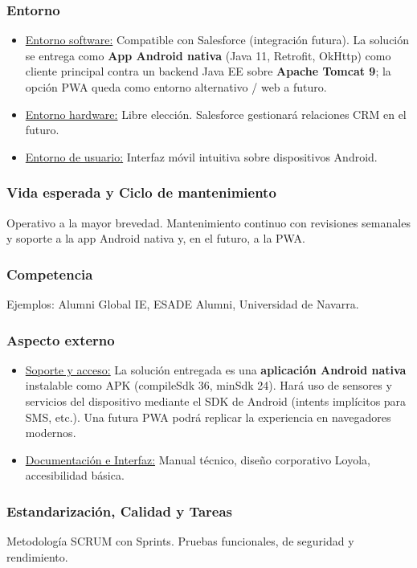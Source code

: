 \documentclass{report}
\begin{document}
\subsubsection{Entorno}
\begin{itemize}
    \item{\underline{Entorno software:}} Compatible con Salesforce (integración futura). La solución se entrega como \textbf{App Android nativa} (Java 11, Retrofit, OkHttp) como cliente principal contra un backend Java EE sobre \textbf{Apache Tomcat 9}; la opción PWA queda como entorno alternativo / web a futuro.
    \item{\underline{Entorno hardware:}} Libre elección. Salesforce gestionará relaciones CRM en el futuro.
    \item{\underline{Entorno de usuario:}} Interfaz móvil intuitiva sobre dispositivos Android.
\end{itemize}

\subsubsection{Vida esperada y Ciclo de mantenimiento}
Operativo a la mayor brevedad. Mantenimiento continuo con revisiones semanales y soporte a la app Android nativa y, en el futuro, a la PWA.

\subsubsection{Competencia}
Ejemplos: Alumni Global IE, ESADE Alumni, Universidad de Navarra.

\subsubsection{Aspecto externo}
\begin{itemize}
    \item{\underline{Soporte y acceso:}} La solución entregada es una \textbf{aplicación Android nativa} instalable como APK (compileSdk 36, minSdk 24). Hará uso de sensores y servicios del dispositivo mediante el SDK de Android (intents implícitos para SMS, etc.). Una futura PWA podrá replicar la experiencia en navegadores modernos.
    \item{\underline{Documentación e Interfaz:}} Manual técnico, diseño corporativo Loyola, accesibilidad básica.
\end{itemize}

\subsubsection{Estandarización, Calidad y Tareas}
Metodología SCRUM con Sprints. Pruebas funcionales, de seguridad y rendimiento.
\end{document}
